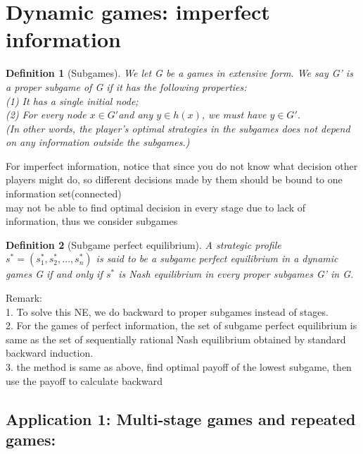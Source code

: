 \documentclass[twoside]{article}
\theoremstyle{definitionstyle}
\newtheorem*{definition}{Definition}
\begin{document}
\section{Dynamic games: imperfect information}
\begin{definition}[Subgames]
  We let G be a games in extensive form. We say G' is a proper subgame 
of G if it has the following properties: \\
(1) It has a single initial node; \\
(2) For every node $x \in G' $and any $y\in h(x)$, we must have $y\in G'$. \\
(In other words, the player's optimal strategies in the subgames does not depend on any information outside the subgames.) 
\end{definition}
For imperfect information, notice that since you do not know what decision other players might do, so different 
decisions made by them should be bound to one information set(connected)\\
\newline
%
may not be able to find optimal decision in every stage due to lack of information, thus we consider subgames 
\begin{definition}[Subgame perfect equilibrium]
A strategic profile $s^*=(s_1^*, s_2^*, \dots, s_n^*)$ is said to be a subgame perfect 
equilibrium in a dynamic games G if and only if $s^*$ is Nash equilibrium in every proper subgames G' in G.  
\end{definition}
Remark:\\
1. To solve this NE, we do backward to proper subgames instead of stages.\\
2. For the games of perfect information, the set of subgame perfect equilibrium is same as the set of sequentially rational Nash equilibrium obtained by standard backward induction. \\
3. the method is same as above, find optimal payoff of the lowest subgame, then use the payoff to calculate backward\\

\subsection{Application 1: Multi-stage games and repeated games:} 
\end{document}
